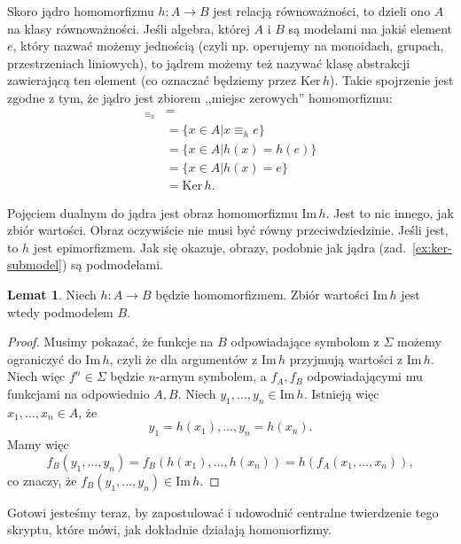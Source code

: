 \documentclass{book}
\theoremstyle{definition}
\newtheorem{lemma}{Lemat}[section]
\begin{document}
Skoro jądro homomorfizmu $h: A \to B$ jest relacją równoważności,
	to dzieli ono $A$ na klasy równoważności.
Jeśli algebra,
	której $A$ i $B$ są modelami ma jakiś element $e$,
	który nazwać możemy jednością
	(czyli np. operujemy na monoidach, grupach, przestrzeniach liniowych),
	to jądrem możemy też nazywać klasę abstrakcji zawierającą ten element
	(co oznaczać będziemy przez $\mathrm{Ker}\,h$).
Takie spojrzenie jest zgodne z tym,
	że jądro jest zbiorem ,,miejsc zerowych'' homomorfizmu:
\begin{align}
	[e]_{\equiv_h} &= \\
		&= \{x \in A | x \equiv_h e \} \\
		&= \{x \in A | h(x) = h(e) \} \\
		&= \{x \in A | h(x) = e \}\\
		&= \mathrm{Ker}\,h.
\end{align}

Pojęciem dualnym do jądra jest obraz homomorfizmu $\mathrm{Im}\,h$.
Jest to nic innego,
	jak zbiór wartości.
Obraz oczywiście nie musi być równy przeciwdziedzinie.
Jeśli jest,
	to $h$ jest epimorfizmem.
Jak się okazuje,
	obrazy,
	podobnie jak jądra (zad.~\ref{ex:ker-submodel}) są podmodelami.

\begin{lemma}
	Niech $h: A \to B$ będzie homomorfizmem.
	Zbiór wartości $\mathrm{Im}\,h$ jest wtedy podmodelem $B$.
\end{lemma}
\begin{proof}
	Musimy pokazać,
		że funkcje na $B$ odpowiadające symbolom z $\Sigma$ możemy ograniczyć do $\mathrm{Im}\,h$,
		czyli że dla argumentów z $\mathrm{Im}\,h$ przyjmują wartości z $\mathrm{Im}\,h$.
	Niech więc $f^n \in \Sigma$ będzie $n$-arnym symbolem,
		a $f_A, f_B$ odpowiadającymi mu funkcjami na odpowiednio $A, B$.
	Niech $y_1, \dots, y_n \in \mathrm{Im}\,h$.
	Istnieją więc $x_1, \dots, x_n \in A$,
		że
	\begin{equation}
		y_1 = h(x_1), \dots, y_n = h(x_n).
	\end{equation}
	Mamy więc
	\begin{equation}
		f_B(y_1, \dots, y_n) = f_B(h(x_1), \dots, h(x_n)) = h(f_A(x_1, \dots, x_n)),
	\end{equation}
	co znaczy,
		że $f_B(y_1, \dots, y_n) \in \mathrm{Im}\,h$.
\end{proof}

Gotowi jesteśmy teraz,
	by zapostulować i udowodnić centralne twierdzenie tego skryptu,
	które mówi,
	jak dokładnie działają homomorfizmy.
\end{document}
